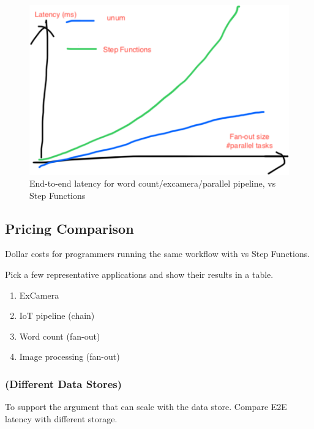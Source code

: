 \begin{figure}[t!]
    \centering
    \includegraphics[width=\columnwidth]{figures/Sketch3.png}
    \caption{End-to-end latency for word count/excamera/parallel pipeline,
    \name{} vs Step Functions}
\end{figure}

\subsection{Pricing Comparison}

Dollar costs for programmers running the same workflow with \name{} vs Step
Functions.

Pick a few representative applications and show their results in a table.

\begin{enumerate}
	\item ExCamera
	\item IoT pipeline (chain)
	\item Word count (fan-out)
	\item Image processing (fan-out)
\end{enumerate}

\subsubsection{(Different Data Stores)}

To support the argument that \name{} can scale with the data store. Compare
E2E latency with different storage.
